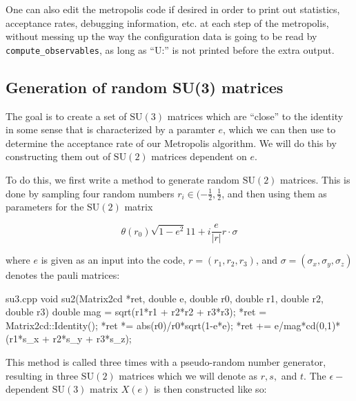 \documentclass[11pt]{article}
\begin{document}
One can also edit the metropolis code if desired in order to print out statistics, acceptance rates, debugging information, etc. at each step of the metropolis, without messing up the way the configuration data is going to be read by \lstinline{compute_observables}, as long as ``U:'' is not printed before the extra output.

\subsection{Generation of random SU(3) matrices}

\label{sec:random_su3}

The goal is to create a set of $\mathrm{SU}(3)$ matrices which are ``close'' to the identity in some sense that is characterized by a paramter $e$, which we can then use to determine the acceptance rate of our Metropolis algorithm. We will do this by constructing them out of $\mathrm{SU}(2)$ matrices dependent on $e$.

To do this, we first write a method to generate random $\mathrm{SU}(2)$ matrices. This is done by sampling four random numbers $r_i\in(-\frac{1}{2},\frac{1}{2}$, and then using them as parameters for the $\mathrm{SU}(2)$ matrix

\begin{equation}\theta(r_0)\sqrt{1-e^2}1\!\!1+i\frac{e}{|r|} r\cdot\sigma\end{equation}

where $e$ is given as an input into the code, $r=(r_1,r_2,r_3)$, and $\sigma=(\sigma_x,\sigma_y,\sigma_z)$ denotes the pauli matrices:

\begin{center}
\begin{minipage}{0.91\linewidth}
\begin{code}{su3.cpp}
void su2(Matrix2cd *ret, double e, double r0, double r1, double r2, double r3)
{
        double mag = sqrt(r1*r1 + r2*r2 + r3*r3);
        *ret = Matrix2cd::Identity();
        *ret *= abs(r0)/r0*sqrt(1-e*e);
        *ret += e/mag*cd(0,1)*(r1*s_x + r2*s_y + r3*s_z);
}
\end{code}
\end{minipage}
\end{center}

This method is called three times with a pseudo-random number generator, resulting in three $\mathrm{SU}(2)$ matrices which we will denote as $r,s,$ and $t$. The $\epsilon-$dependent $\mathrm{SU}(3)$ matrix $X(e)$ is then constructed like so:
\end{document}
